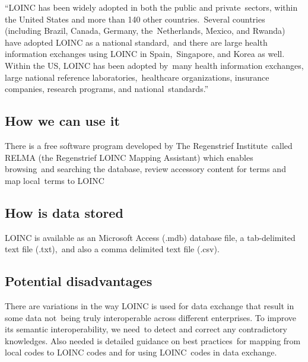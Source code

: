 ``LOINC has been widely adopted in both the public and private\
sectors, within the United States and more than 140 other countries.\
Several countries (including Brazil, Canada, Germany, the\
Netherlands, Mexico, and Rwanda) have adopted LOINC as a national standard,\
 and there are large health information exchanges using LOINC in Spain,\
 Singapore, and Korea as well. Within the US, LOINC has been adopted by\
 many health information exchanges, large national reference laboratories,\
 healthcare organizations, insurance companies, research programs, and national\
standards.''\citep{kroth_using_2012} 

 \subsection{How we can use it}

  There is a free software program developed by The Regenstrief Institute\
  called RELMA (the Regenstrief LOINC Mapping Assistant) which enables browsing\
  and searching the database, review accessory content for terms and map local\
  terms to LOINC \citep{kroth_using_2012} 

  \subsection{How is data stored}

LOINC is available as an Microsoft Access (.mdb) database file, a tab-delimited text file (.txt),\
 and also a comma delimited text file (.csv).\citep{_Vreeman_2013}\

 \subsection{Potential disadvantages}

 There are variations in the way LOINC is used for data exchange that result in some data not\
being truly interoperable across different enterprises. To improve its semantic interoperability, we need\
to detect and correct any contradictory knowledges. Also needed is detailed guidance on best practices\
for mapping from local codes to LOINC codes and for using LOINC\ 
codes in data exchange. \citep{lin_auditing_2012}



